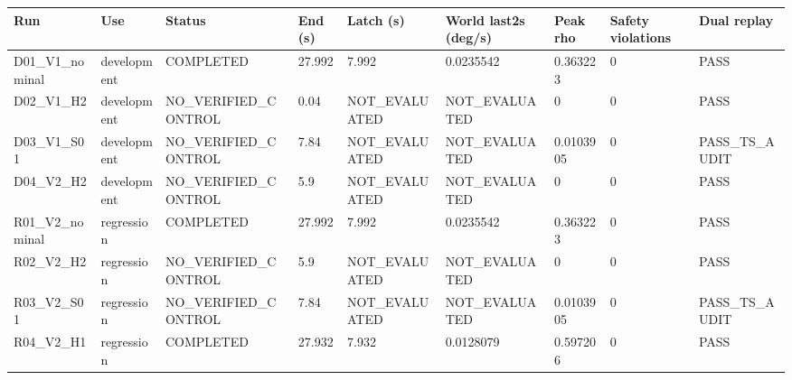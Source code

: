 \begin{tabular}{lllllllll}
\hline
Run & Use & Status & End (s) & Latch (s) & World last2s (deg/s) & Peak rho & Safety violations & Dual replay \\
\hline
D01\_V1\_nominal & development & COMPLETED & 27.992 & 7.992 & 0.0235542 & 0.363223 & 0 & PASS \\
D02\_V1\_H2 & development & NO\_VERIFIED\_CONTROL & 0.04 & NOT\_EVALUATED & NOT\_EVALUATED & 0 & 0 & PASS \\
D03\_V1\_S01 & development & NO\_VERIFIED\_CONTROL & 7.84 & NOT\_EVALUATED & NOT\_EVALUATED & 0.0103905 & 0 & PASS\_TS\_AUDIT \\
D04\_V2\_H2 & development & NO\_VERIFIED\_CONTROL & 5.9 & NOT\_EVALUATED & NOT\_EVALUATED & 0 & 0 & PASS \\
R01\_V2\_nominal & regression & COMPLETED & 27.992 & 7.992 & 0.0235542 & 0.363223 & 0 & PASS \\
R02\_V2\_H2 & regression & NO\_VERIFIED\_CONTROL & 5.9 & NOT\_EVALUATED & NOT\_EVALUATED & 0 & 0 & PASS \\
R03\_V2\_S01 & regression & NO\_VERIFIED\_CONTROL & 7.84 & NOT\_EVALUATED & NOT\_EVALUATED & 0.0103905 & 0 & PASS\_TS\_AUDIT \\
R04\_V2\_H1 & regression & COMPLETED & 27.932 & 7.932 & 0.0128079 & 0.597206 & 0 & PASS \\
\hline
\end{tabular}
